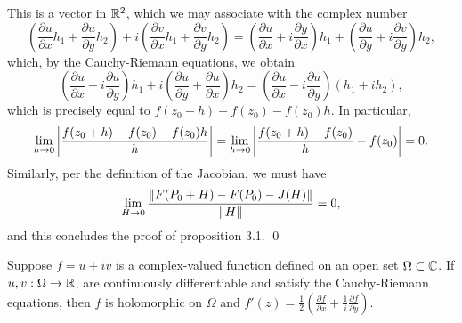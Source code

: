 This is a vector in $\mathbb R^2$, which we may associate with the complex number
\[ \left(\frac{\partial u}{\partial x} h_1 + \frac{\partial u}{\partial y} h_2\right) + i \left(\frac{\partial v}{\partial x} h_1 + \frac{\partial v}{\partial y} h_2\right) = \left(\frac{\partial u}{\partial x} + i \frac{\partial y}{\partial x}\right) h_1 + \left(\frac{\partial u}{\partial y} + i \frac{\partial v}{\partial y}\right) h_2, \]
which, by the Cauchy-Riemann equations, we obtain
\[ \left(\frac{\partial u}{\partial x} - i \frac{\partial u}{\partial y}\right) h_1 + i \left(\frac{\partial u}{\partial y} + \frac{\partial u}{\partial x}\right) h_2 = \left(\frac{\partial u}{\partial x} - i \frac{\partial u}{\partial y}\right)(h_1 + ih_2), \]
which is precisely equal to $f(z_0 + h) - f(z_0) - f(z_0) h$. In particular,
\[ \lim_{h \to 0} \left\lvert \frac{f(z_0 + h) - f(z_0) - f(z_0)h}{h} \right\rvert = \lim_{h \to 0} \left\lvert \frac{f(z_0 + h) - f(z_0)}{h} - f(z_0) \right\rvert = 0. \]
Similarly, per the definition of the Jacobian, we must have
\[ \lim_{H \to 0} \frac{\left\lVert F(P_0 + H) - F(P_0) - J(H) \right\rVert}{\left\lVert H \right\rVert} = 0, \]
and this concludes the proof of proposition 3.1. \qed
\newpage
\begin{theorem}
    Suppose $f = u + iv$ is a complex-valued function defined on an open set $\Omega \subset \mathbb C$. If $u, v : \Omega \to \mathbb R$, are continuously differentiable and satisfy the Cauchy-Riemann equations, then $f$ is holomorphic on $\Omega$ and $f'(z) = \frac{1}{2} \left(\frac{\partial f}{\partial x} + \frac{1}{i} \frac{\partial f}{\partial y}\right)$.
\end{theorem}
